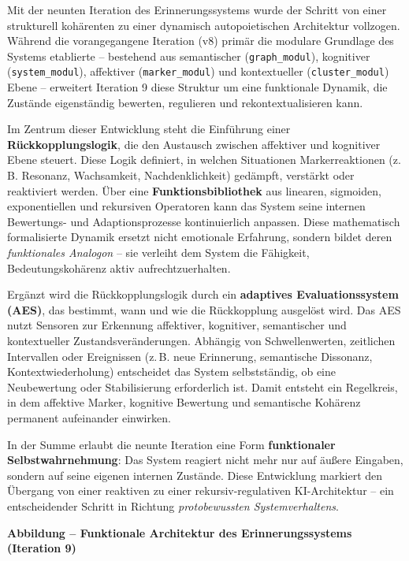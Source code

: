 Mit der neunten Iteration des Erinnerungssystems wurde der Schritt von einer strukturell kohärenten zu einer dynamisch autopoietischen Architektur vollzogen. 
Während die vorangegangene Iteration (v8) primär die modulare Grundlage des Systems etablierte – bestehend aus semantischer (\texttt{graph\_modul}), kognitiver (\texttt{system\_modul}), affektiver (\texttt{marker\_modul}) und kontextueller (\texttt{cluster\_modul}) Ebene – erweitert Iteration 9 diese Struktur um eine funktionale Dynamik, die Zustände eigenständig bewerten, regulieren und rekontextualisieren kann.

Im Zentrum dieser Entwicklung steht die Einführung einer \textbf{Rückkopplungslogik}, die den Austausch zwischen affektiver und kognitiver Ebene steuert. 
Diese Logik definiert, in welchen Situationen Markerreaktionen (z.\,B. Resonanz, Wachsamkeit, Nachdenklichkeit) gedämpft, verstärkt oder reaktiviert werden. 
Über eine \textbf{Funktionsbibliothek} aus linearen, sigmoiden, exponentiellen und rekursiven Operatoren kann das System seine internen Bewertungs- und Adaptionsprozesse kontinuierlich anpassen. 
Diese mathematisch formalisierte Dynamik ersetzt nicht emotionale Erfahrung, sondern bildet deren \emph{funktionales Analogon} – sie verleiht dem System die Fähigkeit, Bedeutungskohärenz aktiv aufrechtzuerhalten.

Ergänzt wird die Rückkopplungslogik durch ein \textbf{adaptives Evaluationssystem (AES)}, das bestimmt, wann und wie die Rückkopplung ausgelöst wird. 
Das AES nutzt Sensoren zur Erkennung affektiver, kognitiver, semantischer und kontextueller Zustandsveränderungen. 
Abhängig von Schwellenwerten, zeitlichen Intervallen oder Ereignissen (z.\,B. neue Erinnerung, semantische Dissonanz, Kontextwiederholung) entscheidet das System selbstständig, ob eine Neubewertung oder Stabilisierung erforderlich ist. 
Damit entsteht ein Regelkreis, in dem affektive Marker, kognitive Bewertung und semantische Kohärenz permanent aufeinander einwirken.

In der Summe erlaubt die neunte Iteration eine Form \textbf{funktionaler Selbstwahrnehmung}: 
Das System reagiert nicht mehr nur auf äußere Eingaben, sondern auf seine eigenen internen Zustände. 
Diese Entwicklung markiert den Übergang von einer reaktiven zu einer rekursiv-regulativen KI-Architektur – ein entscheidender Schritt in Richtung \emph{protobewussten Systemverhaltens}.

\vspace{1.5em}
\noindent
\textbf{Abbildung – Funktionale Architektur des Erinnerungssystems (Iteration 9)}\\
\vspace{0.5em}

